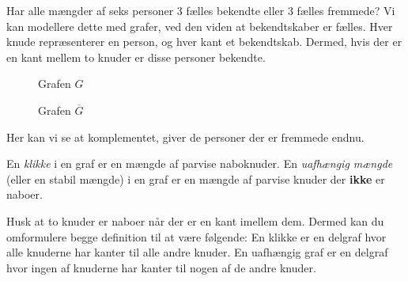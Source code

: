 \begin{example}
  \label{ex:1.1.7}
Har alle mængder af seks personer 3 fælles bekendte eller 3 fælles fremmede? Vi kan modellere dette med grafer, ved den viden at bekendtskaber er fælles. Hver knude repræsenterer en person, og hver kant et bekendtskab. Dermed, hvis der er en kant mellem to knuder er disse personer bekendte.
\begin{figure}[H]
  \centering
  \begin{minipage}{0.45\textwidth}
    \centering
    \caption{\label{} Grafen $G$}
  \end{minipage}
  \hfill
  \begin{minipage}{0.45\textwidth}
    \centering
    \caption{Grafen $\overline{G}$}
  \end{minipage}
\end{figure}
  Her kan vi se at komplementet, giver de personer der er fremmede endnu.
\end{example}



\begin{definition}
En \textit{klikke} i en graf er en mængde af parvise naboknuder. En \textit{uafhængig mængde} (eller en stabil mængde) i en graf er en mængde af parvise knuder der \textbf{ikke} er naboer.
\end{definition}

Husk at to knuder er naboer når der er en kant imellem dem. Dermed kan du omformulere begge definition til at være følgende: En klikke er en delgraf hvor alle knuderne har kanter til alle andre knuder. En uafhængig graf er en delgraf hvor ingen af knuderne har kanter til nogen af de andre knuder.

